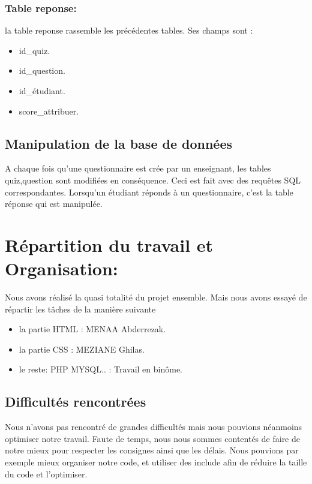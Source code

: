 \documentclass[12pt,a4paper]{article}
\begin{document}
\subsubsection{Table reponse:}
la table reponse rassemble les précédentes tables. Ses champs sont :
\begin{itemize}
\item id\_quiz.
\item id\_question.
\item id\_étudiant.
\item score\_attribuer.
\end{itemize}






 
\subsection{Manipulation de la base de données}
 A chaque fois qu'une questionnaire est crée par un enseignant, les tables quiz,question sont modifiées en conséquence. 
 Ceci est fait avec des requêtes SQL correspondantes.
 Lorsqu'un étudiant réponds à un questionnaire, c'est la table réponse qui est manipulée.
  
\section{Répartition du travail et Organisation:}
 	Nous avons réalisé la quasi totalité du projet ensemble. Mais nous avons essayé de répartir les tâches de la manière suivante 
  \begin{itemize}
   \item la partie HTML : MENAA Abderrezak.
   \item la partie CSS : MEZIANE Ghilas.
   \item le reste: PHP MYSQL.. : Travail en binôme.
  \end{itemize}
 \subsection{Difficultés rencontrées}
  Nous n'avons pas rencontré de grandes difficultés mais nous pouvions néanmoins optimiser notre travail. Faute de temps, 
  nous nous sommes contentés de faire de notre mieux pour respecter les consignes ainsi que les délais.
  Nous pouvions par exemple mieux organiser notre code, et utiliser des include afin de réduire la taille du code et l'optimiser. 
\end{document}
